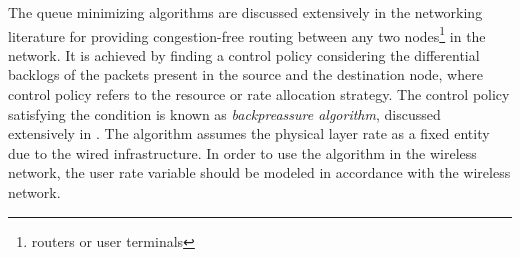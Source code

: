 
The queue minimizing algorithms are discussed extensively in the networking literature for providing congestion-free routing between any two nodes\footnote{routers or user terminals} in the network. It is achieved by finding a control policy considering the differential backlogs of the packets present in the source and the destination node, where control policy refers to the resource or rate allocation strategy. The control policy satisfying the condition is known as \emph{backpreassure algorithm}, discussed extensively in \cite{tassiulas,georgiadis2006resource,neely2010stochastic}. The algorithm assumes the physical layer rate as a fixed entity due to the wired infrastructure. In order to use the algorithm in the wireless network, the user rate variable  should be modeled in accordance with the wireless network.

